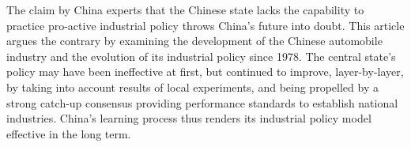 The claim by China experts that the Chinese state lacks the capability to practice pro-active industrial policy throws China's future into doubt. This article argues the contrary by examining the development of the Chinese automobile industry and the evolution of its industrial policy since 1978. The central state's policy may have been ineffective at first, but continued to improve, layer-by-layer, by taking into account results of local experiments, and being propelled by a strong catch-up consensus providing performance standards to establish national industries. China's learning process thus renders its industrial policy model effective in the long term.
